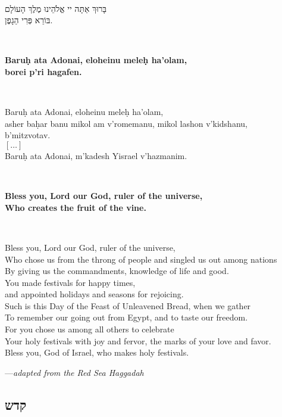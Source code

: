 \documentclass[a4paper,10pt,openany]{memoir}
\newcommand{\HgInst}[1]{{\noindent\sffamily{\bfseries{#1}}}}
\newcommand{\HgEllipsis}{\ensuremath{\left[\ldots\right]}}
\newcommand{\HgSource}[1]{\hfill{\small---\itshape{#1}}}
\newcommand{\hchapter}[1]{
  \begin{otherlanguage}{hebrew}
    \chapter*{#1}
  \end{otherlanguage}
}
\newcommand{\HgHL}[1]{{\Large\bfseries#1\par\noindent\\[-.5em]}}
\newenvironment{HgEnglish}{\strut\\\noindent}{\vspace{1em}}
\newenvironment{HgTranslit}{\strut\\\noindent\begin{itshape}}{\end{itshape}\vspace{1em}}
\newenvironment{HgHebrew}{\begin{otherlanguage}{hebrew}\strut\\\noindent\Large
}{\par\end{otherlanguage}\vspace{1em}}
\begin{document}
\begin{HgHebrew} 
  בָּרוּךְ אַתָּה יי אֱלֹהֵינוּ מֶלֶךְ הָעוֹלָם 
  \\
  בּוֹרֵא פְּרִי הַגָפֶן.
\end{HgHebrew}

\begin{HgTranslit}
  \HgHL{Baru\d{h} ata Adonai, eloheinu mele\d{h} ha'olam, \\
  borei p'ri hagafen.}
  Baru\d{h} ata Adonai, eloheinu mele\d{h} ha'olam, \\
  asher ba\d{h}ar banu mikol am v'romemanu, mikol lashon v'kidshanu, \\
  b'mitzvotav. \\
  \HgEllipsis \\
  Baru\d{h} ata Adonai, m'kadesh Yisrael v'hazmanim.
\end{HgTranslit}

\begin{HgEnglish}
  \HgHL{Bless you, Lord our God, ruler of the universe, \\
  Who creates the fruit of the vine.}
  Bless you, Lord our God, ruler of the universe, \\
  Who chose us from the throng of people and singled us out among nations \\
  By giving us the commandments, knowledge of life and good. \\
  You made festivals for happy times, \\
  and appointed holidays and seasons for rejoicing. \\
  Such is this Day of the Feast of Unleavened Bread, when we gather \\
  To remember our going out from Egypt, and to taste our freedom. \\
  For you chose us among all others to celebrate \\
  Your holy festivals with joy and fervor, the marks of your love and favor. \\
  Bless you, God of Israel, who makes holy festivals.

  \HgSource{adapted from the Red Sea Haggadah}
\end{HgEnglish}

\HgInst{Drink the first cup.}

\vfill

\hchapter{קדש}
\end{document}

